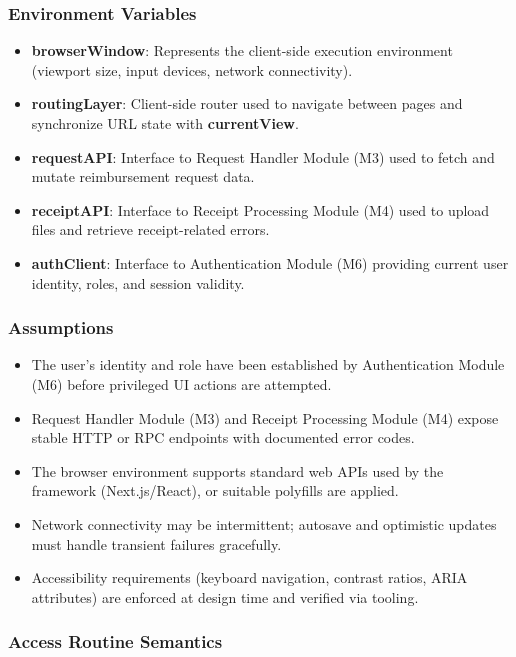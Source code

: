 \documentclass[12pt, titlepage]{article}
\begin{document}
\subsubsection{Environment Variables}

\begin{itemize}
  \item \textbf{browserWindow}: Represents the client-side execution environment (viewport size, input devices, network connectivity).
  \item \textbf{routingLayer}: Client-side router used to navigate between pages and synchronize URL state with \textbf{currentView}.
  \item \textbf{requestAPI}: Interface to Request Handler Module (M3) used to fetch and mutate reimbursement request data.
  \item \textbf{receiptAPI}: Interface to Receipt Processing Module (M4) used to upload files and retrieve receipt-related errors.
  \item \textbf{authClient}: Interface to Authentication Module (M6) providing current user identity, roles, and session validity.
\end{itemize}

\subsubsection{Assumptions}

\begin{itemize}
  \item The user’s identity and role have been established by Authentication Module (M6) before privileged UI actions are attempted.
  \item Request Handler Module (M3) and Receipt Processing Module (M4) expose stable HTTP or RPC endpoints with documented error codes.
  \item The browser environment supports standard web APIs used by the framework (Next.js/React), or suitable polyfills are applied.
  \item Network connectivity may be intermittent; autosave and optimistic updates must handle transient failures gracefully.
  \item Accessibility requirements (keyboard navigation, contrast ratios, ARIA attributes) are enforced at design time and verified via tooling.
\end{itemize}

\subsubsection{Access Routine Semantics}
\end{document}
